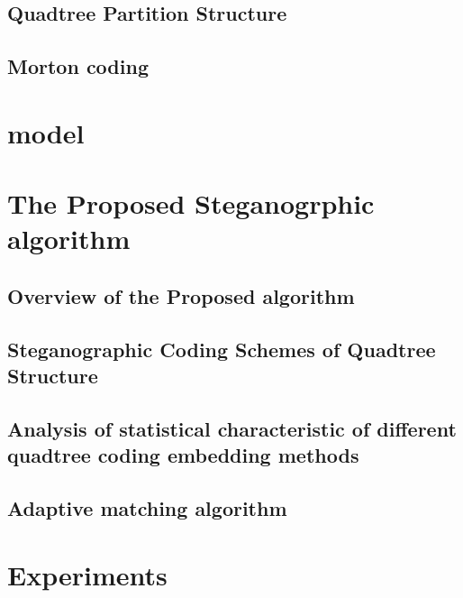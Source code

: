 \documentclass[journal,sort]{IEEEtran}
\begin{document}
\subsection{Quadtree Partition Structure}
\subsection{Morton coding}

\section{model}

\section{The Proposed Steganogrphic algorithm}


\subsection{Overview of the Proposed algorithm}
\subsection{Steganographic Coding Schemes of Quadtree Structure}

\subsection{Analysis of statistical characteristic of different quadtree coding embedding methods}



\subsection{Adaptive matching algorithm}


\section{Experiments}




	
	
	
	
	
	
	
\end{document}

